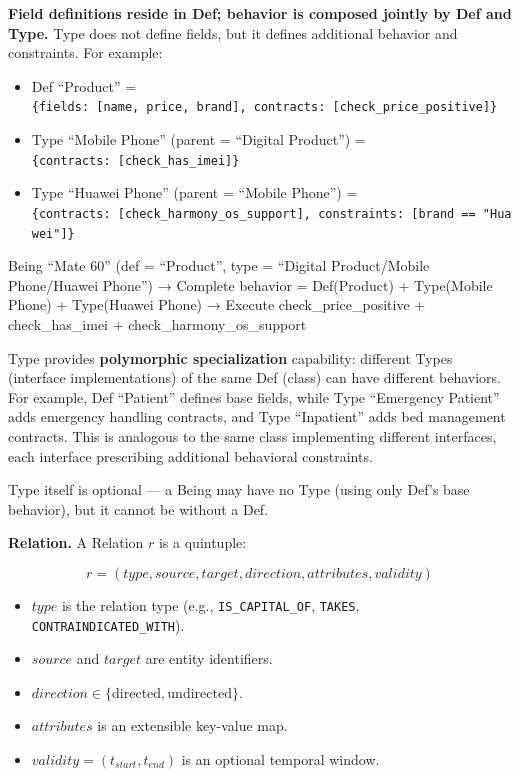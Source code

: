 \documentclass[11pt,a4paper]{article}
\begin{document}
\textbf{Field definitions reside in Def; behavior is composed jointly by
Def and Type.} Type does not define fields, but it defines additional
behavior and constraints. For example:

\begin{itemize}
\tightlist
\item
  Def ``Product'' =
  \texttt{\{fields:\ {[}name,\ price,\ brand{]},\ contracts:\ {[}check\_price\_positive{]}\}}
\item
  Type ``Mobile Phone'' (parent = ``Digital Product'') =
  \texttt{\{contracts:\ {[}check\_has\_imei{]}\}}
\item
  Type ``Huawei Phone'' (parent = ``Mobile Phone'') =
  \texttt{\{contracts:\ {[}check\_harmony\_os\_support{]},\ constraints:\ {[}brand\ ==\ "Huawei"{]}\}}
\end{itemize}

Being ``Mate 60'' (def = ``Product'', type = ``Digital Product/Mobile
Phone/Huawei Phone'') → Complete behavior = Def(Product) + Type(Mobile
Phone) + Type(Huawei Phone) → Execute check\_price\_positive +
check\_has\_imei + check\_harmony\_os\_support

Type provides \textbf{polymorphic specialization} capability: different
Types (interface implementations) of the same Def (class) can have
different behaviors. For example, Def ``Patient'' defines base fields,
while Type ``Emergency Patient'' adds emergency handling contracts, and
Type ``Inpatient'' adds bed management contracts. This is analogous to
the same class implementing different interfaces, each interface
prescribing additional behavioral constraints.

Type itself is optional --- a Being may have no Type (using only Def's
base behavior), but it cannot be without a Def.

\textbf{Relation.} A Relation \(r\) is a quintuple:

\[r = (type, source, target, direction, attributes, validity)\]

\begin{itemize}
\tightlist
\item
  \(type\) is the relation type (e.g., \texttt{IS\_CAPITAL\_OF},
  \texttt{TAKES}, \texttt{CONTRAINDICATED\_WITH}).
\item
  \(source\) and \(target\) are entity identifiers.
\item
  \(direction \in \{\text{directed}, \text{undirected}\}\).
\item
  \(attributes\) is an extensible key-value map.
\item
  \(validity = (t_{start}, t_{end})\) is an optional temporal window.
\end{itemize}
\end{document}
